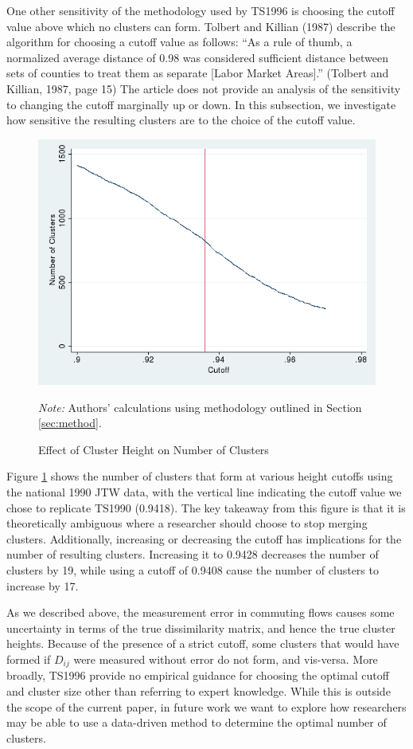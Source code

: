 One other sensitivity of the methodology used by TS1996 is choosing the cutoff value above which no clusters can form. Tolbert and Killian (1987) describe the algorithm for choosing a cutoff value as follows: ``As a rule of thumb, a normalized average distance of 0.98 was considered sufficient distance between sets of counties to treat them as separate [Labor Market Areas].'' (Tolbert and Killian, 1987, page 15) The article does not provide an analysis of the sensitivity to changing the cutoff marginally up or down. In this subsection, we investigate how sensitive the resulting clusters are to the choice of the cutoff value.

\begin{figure}
\includegraphics[scale=0.5]{./figures/numclus_cutoff.png}
\caption{Effect of Cluster Height on Number of Clusters \label{fig:cutoff_count}}
\emph{Note:} Authors' calculations using methodology outlined in Section \ref{sec:method}.
\end{figure}

Figure \ref{fig:cutoff_count} shows the number of clusters that form at various height cutoffs using the national 1990 JTW data, with the vertical line indicating the cutoff value we chose to replicate TS1990 (0.9418). The key takeaway from this figure is that it is theoretically ambiguous where a researcher should choose to stop merging clusters. Additionally, increasing or decreasing the cutoff has implications for the number of resulting clusters. Increasing it to 0.9428 decreases the number of clusters by 19, while using a cutoff of 0.9408 cause the number of clusters to increase by 17.

As we described above, the measurement error in commuting flows causes some uncertainty in terms of the true dissimilarity matrix, and hence the true cluster heights. Because of the presence of a strict cutoff, some clusters that would have formed if $D_{ij}$ were measured without error do not form, and vis-versa. More broadly, TS1996 provide no empirical guidance for choosing the optimal cutoff and cluster size other than referring to expert knowledge. While this is outside the scope of the current paper, in future work we want to explore how researchers may be able to use a data-driven method to determine the optimal number of clusters.

